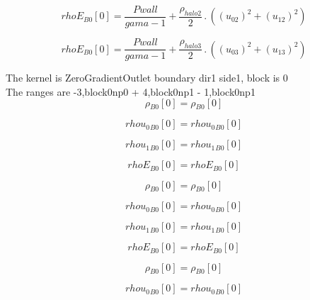 \documentclass{article}
\begin{document}
\begin{dmath}{rhoE{_{B0}}}[{0}] = \frac{Pwall}{gama - 1} + \frac{\rho_{halo 2}}{2} \,.\, \left(\left(u_{02} \right)^{2} + \left(u_{12} \right)^{2}\right)\end{dmath}

\begin{dmath}{rhoE{_{B0}}}[{0}] = \frac{Pwall}{gama - 1} + \frac{\rho_{halo 3}}{2} \,.\, \left(\left(u_{03} \right)^{2} + \left(u_{13} \right)^{2}\right)\end{dmath}

\noindent The kernel is ZeroGradientOutlet boundary dir1 side1, block is 0\\\noindent The ranges are -3,block0np0 + 4,block0np1 - 1,block0np1\\\begin{dmath}{\rho{_{B0}}}[{0}] = {\rho{_{B0}}}[{0}]\end{dmath}

\begin{dmath}{rhou_{0}{_{B0}}}[{0}] = {rhou_{0}{_{B0}}}[{0}]\end{dmath}

\begin{dmath}{rhou_{1}{_{B0}}}[{0}] = {rhou_{1}{_{B0}}}[{0}]\end{dmath}

\begin{dmath}{rhoE{_{B0}}}[{0}] = {rhoE{_{B0}}}[{0}]\end{dmath}

\begin{dmath}{\rho{_{B0}}}[{0}] = {\rho{_{B0}}}[{0}]\end{dmath}

\begin{dmath}{rhou_{0}{_{B0}}}[{0}] = {rhou_{0}{_{B0}}}[{0}]\end{dmath}

\begin{dmath}{rhou_{1}{_{B0}}}[{0}] = {rhou_{1}{_{B0}}}[{0}]\end{dmath}

\begin{dmath}{rhoE{_{B0}}}[{0}] = {rhoE{_{B0}}}[{0}]\end{dmath}

\begin{dmath}{\rho{_{B0}}}[{0}] = {\rho{_{B0}}}[{0}]\end{dmath}

\begin{dmath}{rhou_{0}{_{B0}}}[{0}] = {rhou_{0}{_{B0}}}[{0}]\end{dmath}
\end{document}
